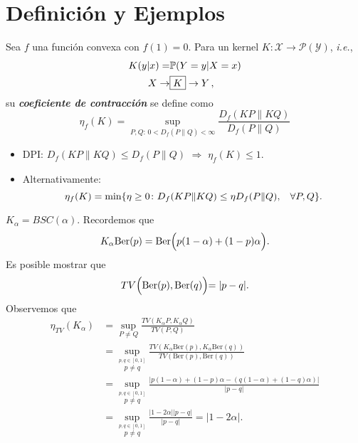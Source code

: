 \section{Definici\'on y Ejemplos}
\begin{definition}
Sea $f$ una funci\'on convexa con $f(1)=0$. Para un kernel $K\colon\mathcal{X}\to\mathcal{P}(\mathcal{Y})$, \textit{i.e.},
\begin{align*}
    K(y|x)=&\mathbb{P}(Y=y|X=x)\\
    X\to&\fbox{$K$}\to Y\,,
\end{align*}
su \textit{\textbf{coeficiente de contracci\'on}} se define como 
\begin{equation*}
    \eta_f(K)=\sup_{P,Q:\,0<D_f(P\|Q)<\infty}\frac{D_f(KP\|KQ)}{D_f(P\|Q)}
\end{equation*}
\end{definition}

\begin{observation}
\begin{itemize}
    \item DPI: $D_f(KP\|KQ)\leq D_f(P\|Q)$ $\Longrightarrow$ $\eta_f(K)\leq1$.
    \item Alternativamente:
    \begin{equation*}
        \eta_f(K)=\min\{\eta\geq0\colon D_f(KP\|KQ)\leq\eta D_f(P\|Q),\hspace{3mm}\forall P,Q\}.
    \end{equation*}
\end{itemize}
\end{observation}

\begin{example}
$K_{\alpha}=BSC(\alpha)$. Recordemos que 
\begin{equation*}
    K_{\alpha}\text{Ber}(p)=\text{Ber}\Bigl(p(1-\alpha)+(1-p)\alpha\Bigl).
\end{equation*}
Es posible mostrar que
\begin{equation*}
    TV\Bigl(\text{Ber}(p),\text{Ber}(q)\Bigl)=|p-q|.
\end{equation*}
Observemos que 
\begin{align*}
    \eta_{TV}(K_\alpha)&=\sup_{P\neq Q}\frac{TV(K_\alpha P,K_\alpha Q)}{TV(P,Q)}\\
    &=\sup_{\overset{p,q\in[0,1]}{p\neq q}}\frac{TV(K_\alpha\text{Ber}(p),K_\alpha\text{Ber}(q))}{TV(\text{Ber}(p),\text{Ber}(q))}\\
    &=\sup_{\overset{p,q\in[0,1]}{p\neq q}}\frac{|p(1-\alpha)+(1-p)\alpha-(q(1-\alpha)+(1-q)\alpha)|}{|p-q|}\\
    &=\sup_{\overset{p,q\in[0,1]}{p\neq q}}\frac{|1-2\alpha||p-q|}{|p-q|}=|1-2\alpha|.
\end{align*}
\end{example}

